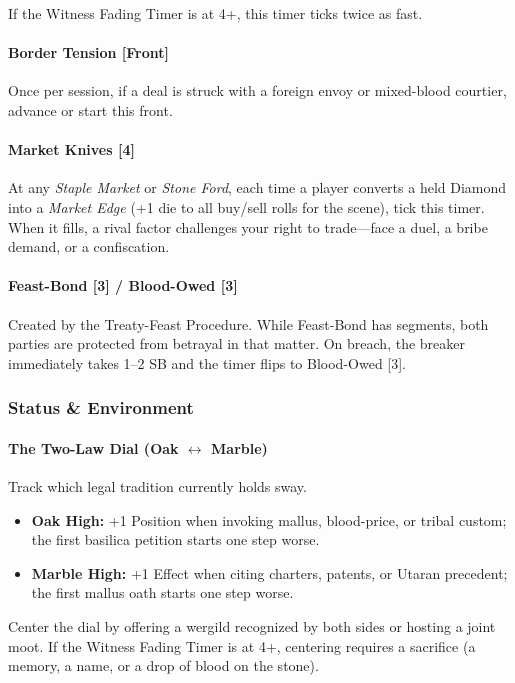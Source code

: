 If the Witness Fading Timer is at 4+, this timer ticks twice as fast.

\paragraph{Border Tension [Front]}
Once per session, if a deal is struck with a foreign envoy or mixed-blood courtier, advance or start this front.

\paragraph{Market Knives [4]}
At any \emph{Staple Market} or \emph{Stone Ford}, each time a player converts a held Diamond into a \emph{Market Edge} (+1 die to all buy/sell rolls for the scene), tick this timer. When it fills, a rival factor challenges your right to trade---face a duel, a bribe demand, or a confiscation.

\paragraph{Feast-Bond [3] / Blood-Owed [3]}
Created by the Treaty-Feast Procedure. While Feast-Bond has segments, both parties are protected from betrayal in that matter. On breach, the breaker immediately takes 1--2 SB and the timer flips to Blood-Owed [3].

\subsubsection{Status \& Environment}

\paragraph{The Two-Law Dial (Oak $\leftrightarrow$ Marble)}
Track which legal tradition currently holds sway.
\begin{itemize}[nosep]
  \item \textbf{Oak High:} +1 Position when invoking mallus, blood-price, or tribal custom; the first basilica petition starts one step worse.
  \item \textbf{Marble High:} +1 Effect when citing charters, patents, or Utaran precedent; the first mallus oath starts one step worse.
\end{itemize}
Center the dial by offering a wergild recognized by both sides or hosting a joint moot. If the Witness Fading Timer is at 4+, centering requires a sacrifice (a memory, a name, or a drop of blood on the stone).

